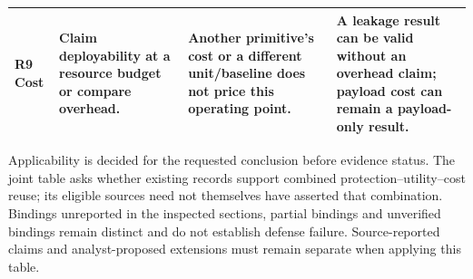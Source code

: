 \begin{table}[t]
\begin{tabularx}{\textwidth}{@{}p{}YYY@{}}
R9 Cost & Claim deployability at a resource budget or compare overhead. & Another primitive's cost or a different unit/baseline does not price this operating point. & A leakage result can be valid without an overhead claim; payload cost can remain a payload-only result.\\\bottomrule
\end{tabularx}
\par\smallskip\raggedright Applicability is decided for the requested conclusion before evidence status. The joint table asks whether existing records support combined protection--utility--cost reuse; its eligible sources need not themselves have asserted that combination. Bindings unreported in the inspected sections, partial bindings and unverified bindings remain distinct and do not establish defense failure. Source-reported claims and analyst-proposed extensions must remain separate when applying this table.
\end{table}
